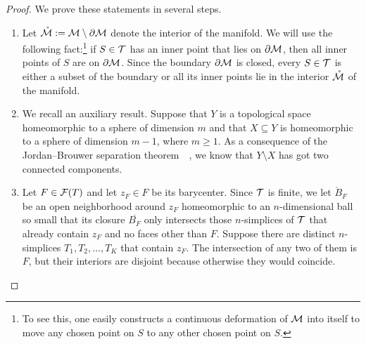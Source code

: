 \documentclass[10pt,a4paper]{article}
\begin{document}
\begin{proof}
    We prove these statements in several steps.
    \begin{enumerate}
    \item 
    Let $\mathring {{\mathcal M}} := {\mathcal M} \setminus \partial {\mathcal M}$ denote the interior of the manifold. 
    We will use the following fact:\footnote{To see this, one easily constructs a continuous deformation of ${\mathcal M}$ into itself to move any chosen point on $S$ to any other chosen point on $S$.} if $S \in {\mathcal T}$ has an inner point that lies on $\partial {\mathcal M}$, then all inner points of $S$ are on $\partial {\mathcal M}$. 
    Since the boundary $\partial {\mathcal M}$ is closed, every $S \in {\mathcal T}$ is either a subset of the boundary or all its inner points lie in the interior $\mathring {{\mathcal M}}$ of the manifold. 
    
    \item 
    We recall an auxiliary result.
    Suppose that $Y$ is a topological space homeomorphic to a sphere of dimension $m$ and that $X \subseteq Y$ is homeomorphic to a sphere of dimension $m-1$, where $m \geq 1$. 
    As a consequence of the Jordan--Brouwer separation theorem~\cite[Corollary IV.5.24]{mayer1989algebraische}~\cite[Corollary VIII.6.4]{massey1981algebraic}, 
    we know that $Y \setminus X$ has got two connected components.
    
    
    \item
    Let $F \in {\mathcal F}(T)$ and let $z_F \in F$ be its barycenter. 
    Since ${\mathcal T}$ is finite, we let $\mathring B_F$ be an open neighborhood around $z_F$ 
    homeomorphic to an $n$-dimensional ball 
    so small that its closure $\overline{B_F}$ only intersects those $n$-simplices of ${\mathcal T}$ that already contain $z_F$ and no faces other than $F$.
    Suppose there are distinct $n$-simplices $T_1, T_2, \dots, T_K$ that contain $z_F$. 
    The intersection of any two of them is $F$, but their interiors are disjoint because otherwise they would coincide. 
    

\end{enumerate}
\end{proof}
\end{document}
